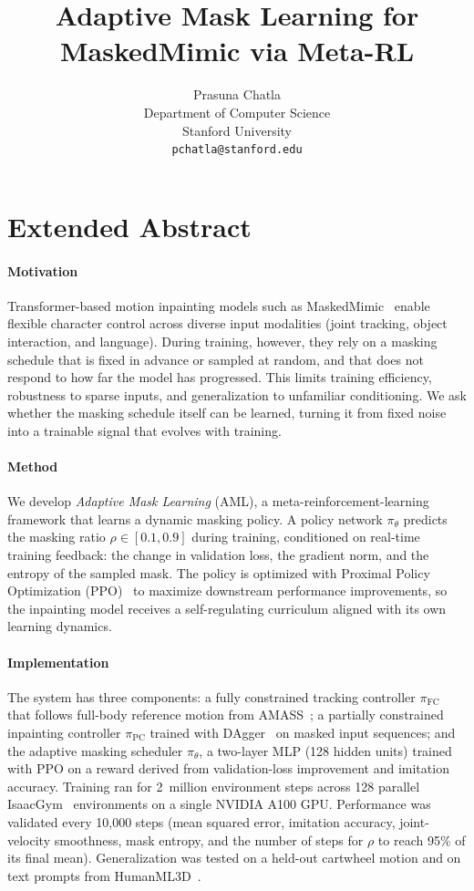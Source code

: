 \documentclass[10pt,letterpaper]{article}
\title{Adaptive Mask Learning for MaskedMimic via Meta-RL}
\author{Prasuna Chatla\\
Department of Computer Science\\
Stanford University\\
\texttt{pchatla@stanford.edu}}
\date{}
\newcommand{\pfc}{\pi_{\mathrm{FC}}}
\newcommand{\ppc}{\pi_{\mathrm{PC}}}
\newcommand{\pth}{\pi_{\theta}}
\begin{document}
\section*{Extended Abstract}

\paragraph{Motivation}
Transformer-based motion inpainting models such as MaskedMimic~\cite{tessler2024maskedmimic} enable flexible character control across diverse input modalities (joint tracking, object interaction, and language). During training, however, they rely on a masking schedule that is fixed in advance or sampled at random, and that does not respond to how far the model has progressed. This limits training efficiency, robustness to sparse inputs, and generalization to unfamiliar conditioning. We ask whether the masking schedule itself can be learned, turning it from fixed noise into a trainable signal that evolves with training.

\paragraph{Method}
We develop \emph{Adaptive Mask Learning} (AML), a meta-reinforcement-learning framework that learns a dynamic masking policy. A policy network $\pth$ predicts the masking ratio $\rho \in [0.1, 0.9]$ during training, conditioned on real-time training feedback: the change in validation loss, the gradient norm, and the entropy of the sampled mask. The policy is optimized with Proximal Policy Optimization (PPO)~\cite{schulman2017ppo} to maximize downstream performance improvements, so the inpainting model receives a self-regulating curriculum aligned with its own learning dynamics.

\paragraph{Implementation}
The system has three components: a fully constrained tracking controller $\pfc$ that follows full-body reference motion from AMASS~\cite{mahmood2019amass}; a partially constrained inpainting controller $\ppc$ trained with DAgger~\cite{ross2011dagger} on masked input sequences; and the adaptive masking scheduler $\pth$, a two-layer MLP (128 hidden units) trained with PPO on a reward derived from validation-loss improvement and imitation accuracy. Training ran for 2~million environment steps across 128 parallel IsaacGym~\cite{makoviychuk2021isaacgym} environments on a single NVIDIA A100 GPU. Performance was validated every 10{,}000 steps (mean squared error, imitation accuracy, joint-velocity smoothness, mask entropy, and the number of steps for $\rho$ to reach 95\% of its final mean). Generalization was tested on a held-out cartwheel motion and on text prompts from HumanML3D~\cite{guo2022humanml3d}.
\end{document}
